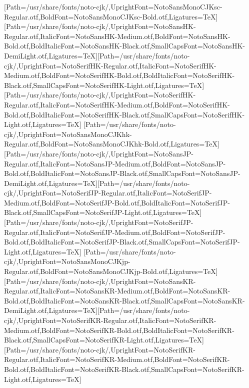 \newfontfamily{}[Path=/usr/share/fonts/noto-cjk/,UprightFont=NotoSansMonoCJKsc-Regular.otf,BoldFont=NotoSansMonoCJKsc-Bold.otf,Ligatures=TeX]
\newfontfamily{}[Path=/usr/share/fonts/noto-cjk/,UprightFont=NotoSansHK-Regular.otf,ItalicFont=NotoSansHK-Medium.otf,BoldFont=NotoSansHK-Bold.otf,BoldItalicFont=NotoSansHK-Black.otf,SmallCapsFont=NotoSansHK-DemiLight.otf,Ligatures=TeX]\newfontfamily{}[Path=/usr/share/fonts/noto-cjk/,UprightFont=NotoSerifHK-Regular.otf,ItalicFont=NotoSerifHK-Medium.otf,BoldFont=NotoSerifHK-Bold.otf,BoldItalicFont=NotoSerifHK-Black.otf,SmallCapsFont=NotoSerifHK-Light.otf,Ligatures=TeX]
\newfontfamily{}[Path=/usr/share/fonts/noto-cjk/,UprightFont=NotoSerifHK-Regular.otf,ItalicFont=NotoSerifHK-Medium.otf,BoldFont=NotoSerifHK-Bold.otf,BoldItalicFont=NotoSerifHK-Black.otf,SmallCapsFont=NotoSerifHK-Light.otf,Ligatures=TeX]
\newfontfamily{}[Path=/usr/share/fonts/noto-cjk/,UprightFont=NotoSansMonoCJKhk-Regular.otf,BoldFont=NotoSansMonoCJKhk-Bold.otf,Ligatures=TeX]
\newfontfamily{}[Path=/usr/share/fonts/noto-cjk/,UprightFont=NotoSansJP-Regular.otf,ItalicFont=NotoSansJP-Medium.otf,BoldFont=NotoSansJP-Bold.otf,BoldItalicFont=NotoSansJP-Black.otf,SmallCapsFont=NotoSansJP-DemiLight.otf,Ligatures=TeX]\newfontfamily{}[Path=/usr/share/fonts/noto-cjk/,UprightFont=NotoSerifJP-Regular.otf,ItalicFont=NotoSerifJP-Medium.otf,BoldFont=NotoSerifJP-Bold.otf,BoldItalicFont=NotoSerifJP-Black.otf,SmallCapsFont=NotoSerifJP-Light.otf,Ligatures=TeX]
\newfontfamily{}[Path=/usr/share/fonts/noto-cjk/,UprightFont=NotoSerifJP-Regular.otf,ItalicFont=NotoSerifJP-Medium.otf,BoldFont=NotoSerifJP-Bold.otf,BoldItalicFont=NotoSerifJP-Black.otf,SmallCapsFont=NotoSerifJP-Light.otf,Ligatures=TeX]
\newfontfamily{}[Path=/usr/share/fonts/noto-cjk/,UprightFont=NotoSansMonoCJKjp-Regular.otf,BoldFont=NotoSansMonoCJKjp-Bold.otf,Ligatures=TeX]
\newfontfamily{}[Path=/usr/share/fonts/noto-cjk/,UprightFont=NotoSansKR-Regular.otf,ItalicFont=NotoSansKR-Medium.otf,BoldFont=NotoSansKR-Bold.otf,BoldItalicFont=NotoSansKR-Black.otf,SmallCapsFont=NotoSansKR-DemiLight.otf,Ligatures=TeX]\newfontfamily{}[Path=/usr/share/fonts/noto-cjk/,UprightFont=NotoSerifKR-Regular.otf,ItalicFont=NotoSerifKR-Medium.otf,BoldFont=NotoSerifKR-Bold.otf,BoldItalicFont=NotoSerifKR-Black.otf,SmallCapsFont=NotoSerifKR-Light.otf,Ligatures=TeX]
\newfontfamily{}[Path=/usr/share/fonts/noto-cjk/,UprightFont=NotoSerifKR-Regular.otf,ItalicFont=NotoSerifKR-Medium.otf,BoldFont=NotoSerifKR-Bold.otf,BoldItalicFont=NotoSerifKR-Black.otf,SmallCapsFont=NotoSerifKR-Light.otf,Ligatures=TeX]
